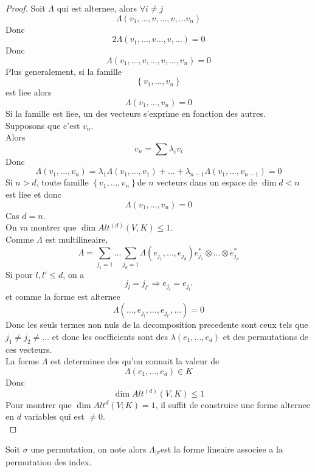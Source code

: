 \documentclass[../main.tex]{subfiles}
\begin{document}
\begin{proof}
Soit $\Lambda$ qui est alternee, alors $\forall i\neq j$ 
\[ 
	\Lambda( v_1, \ldots, v, \ldots, v, \ldots v_n) 
\]
Donc
\[ 
	2\Lambda( v_1,\ldots, v \ldots, v, \ldots ) = 0
\]
Donc
\[ 
	\Lambda( v_1, \ldots, v, \ldots, v, \ldots, v_n) = 0
\]
Plus generalement, si la famille
\[ 
\left\{ v_1, \ldots, v_n \right\} 
\]
est liee alors
\[ 
	\Lambda( v_1, \ldots, v_n) =0
\]
Si la famille est liee, un des vecteurs s'exprime en fonction des autres.\\
Supposons que c'est $v_n$.\\
Alors
\[ 
v_n = \sum \lambda_i v_i
\]
Donc
\[ 
	\Lambda( v_1, \ldots, v_n) = \lambda_1 \Lambda( v_1, \ldots, v_1) + \ldots + \lambda_{n-1}  \Lambda( v_1, \ldots, v_{n-1} )= 0
\]
Si $n>d$, toute famille $ \left\{ v_1, \ldots, v_n \right\} $de $n$ vecteurs dans un espace de $\dim d< n$ est liee et donc 
\[ 
	\Lambda( v_1, \ldots, v_n) =0
\]
Cas $d=n$.\\
On va montrer que $\dim Alt^{( d )}( V,K) \leq 1$.\\
Comme $\Lambda$ est multilineaire,
\[ 
	\Lambda = \sum_{j_1=1} \ldots \sum_{j_d=1} \Lambda( e_{j_1} , \ldots, e_{j_d} ) e_{j_1} ^{*}\otimes \ldots \otimes e_{j_d} ^{*}
\]
Si pour  $l, l'\leq d$, on a 
\[ 
j_{l} = j_{l'} \Rightarrow e_{j_l} = e_{j_l'} 
\]
et comme la forme est alternee
\[ 
	\Lambda( \ldots, e_{j_l} , \ldots, e_{j_{ l' }} , \ldots)=0
\]
Donc les seuls termes non nuls de la decomposition precedente sont ceux tels que $j_1\neq j_2\neq \ldots$ et donc les coefficients sont des $\lambda( e_1, \ldots, e_d) $ et des permutations de ces vecteurs.\\
La forme $\Lambda$ est determinee des qu'on connait la valeur de 
\[ 
	\Lambda( e_1, \ldots, e_d) \in K
\]
Donc 
\[ 
	\dim Alt^{( d) }( V,K) \leq 1
\]
Pour montrer que $\dim Alt^{d}( V;K) =1$, il suffit de construire une forme alternee en $d$ variables qui est $\neq 0$.\\

\end{proof}

Soit $\sigma$ une permutation, on note alors $\Lambda_{|\sigma} $est la forme lineaire associee a la permutation des index.
\end{document}
